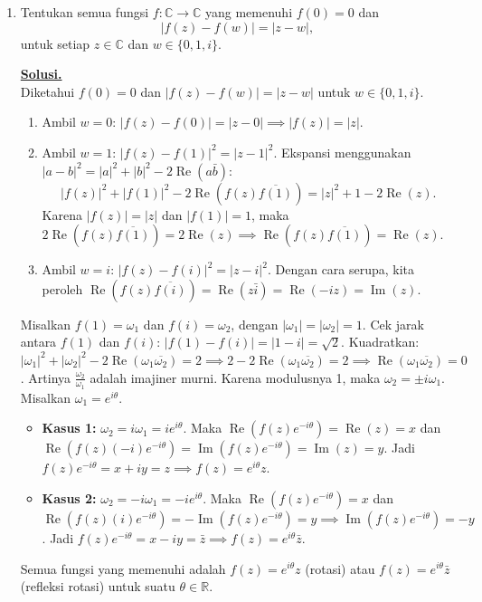 \documentclass[12pt,twoside]{article}
\newenvironment{solution}
{
	\par\noindent\textbf{\underline{Solusi.}}\\
}
{
	\par
}
\begin{document}
\begin{enumerate}
  \item Tentukan semua fungsi $f : \mathbb{C} \to \mathbb{C}$ yang memenuhi $f(0) = 0$ dan
        \[
          |f(z) - f(w)| = |z - w|,
        \]
        untuk setiap $z \in \mathbb{C}$ dan $w \in \{0, 1, i\}$.

        \begin{solution}
          Diketahui $f(0)=0$ dan $|f(z)-f(w)|=|z-w|$ untuk $w \in \{0, 1, i\}$.
          \begin{enumerate}
            \item Ambil $w=0$: $|f(z) - f(0)| = |z - 0| \implies |f(z)| = |z|$.
            \item Ambil $w=1$: $|f(z) - f(1)|^2 = |z - 1|^2$.
                  Ekspansi menggunakan $|a-b|^2 = |a|^2 + |b|^2 - 2\operatorname{Re}(a\bar{b})$:
                  \[ |f(z)|^2 + |f(1)|^2 - 2\operatorname{Re}(f(z)\overline{f(1)}) = |z|^2 + 1 - 2\operatorname{Re}(z). \]
                  Karena $|f(z)|=|z|$ dan $|f(1)|=1$, maka $2\operatorname{Re}(f(z)\overline{f(1)}) = 2\operatorname{Re}(z) \implies \operatorname{Re}(f(z)\overline{f(1)}) = \operatorname{Re}(z)$.
            \item Ambil $w=i$: $|f(z) - f(i)|^2 = |z - i|^2$.
                  Dengan cara serupa, kita peroleh $\operatorname{Re}(f(z)\overline{f(i)}) = \operatorname{Re}(z\bar{i}) = \operatorname{Re}(-iz) = \operatorname{Im}(z)$.
          \end{enumerate}
          Misalkan $f(1) = \omega_1$ dan $f(i) = \omega_2$, dengan $|\omega_1|=|\omega_2|=1$.
          Cek jarak antara $f(1)$ dan $f(i)$:
          $|f(1)-f(i)| = |1-i| = \sqrt{2}$.
          Kuadratkan: $|\omega_1|^2 + |\omega_2|^2 - 2\operatorname{Re}(\omega_1\overline{\omega_2}) = 2 \implies 2 - 2\operatorname{Re}(\omega_1\overline{\omega_2}) = 2 \implies \operatorname{Re}(\omega_1\overline{\omega_2}) = 0$.
          Artinya $\frac{\omega_2}{\omega_1}$ adalah imajiner murni. Karena modulusnya 1, maka $\omega_2 = \pm i \omega_1$.
          Misalkan $\omega_1 = e^{i\theta}$.
          \begin{itemize}
            \item \textbf{Kasus 1:} $\omega_2 = i \omega_1 = i e^{i\theta}$.
                  Maka $\operatorname{Re}(f(z)e^{-i\theta}) = \operatorname{Re}(z) = x$ dan $\operatorname{Re}(f(z)(-i)e^{-i\theta}) = \operatorname{Im}(f(z)e^{-i\theta}) = \operatorname{Im}(z) = y$.
                  Jadi $f(z)e^{-i\theta} = x + iy = z \implies f(z) = e^{i\theta}z$.
            \item \textbf{Kasus 2:} $\omega_2 = -i \omega_1 = -i e^{i\theta}$.
                  Maka $\operatorname{Re}(f(z)e^{-i\theta}) = x$ dan $\operatorname{Re}(f(z)(i)e^{-i\theta}) = -\operatorname{Im}(f(z)e^{-i\theta}) = y \implies \operatorname{Im}(f(z)e^{-i\theta}) = -y$.
                  Jadi $f(z)e^{-i\theta} = x - iy = \bar{z} \implies f(z) = e^{i\theta}\bar{z}$.
          \end{itemize}
          Semua fungsi yang memenuhi adalah $f(z) = e^{i\theta}z$ (rotasi) atau $f(z) = e^{i\theta}\bar{z}$ (refleksi rotasi) untuk suatu $\theta \in \mathbb{R}$.
        \end{solution}


\end{enumerate}
\end{document}
